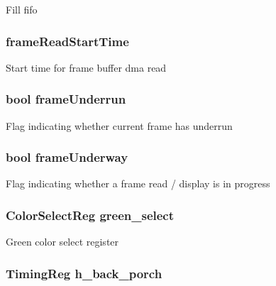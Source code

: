 \label{classHDLcd_a1735216e127216309b2b871f35b62fc7}
Fill fifo \hypertarget{classHDLcd_a9c95baa754410596ad866c39aba696f4}{
\subsubsection[{frameReadStartTime}]{ {\bf frameReadStartTime}}}
\label{classHDLcd_a9c95baa754410596ad866c39aba696f4}
Start time for frame buffer dma read \hypertarget{classHDLcd_a2c55466de4118724cb375f5d1c7844e8}{
\subsubsection[{frameUnderrun}]{\setlength{\rightskip}{0pt plus 5cm}bool {\bf frameUnderrun}}}
\label{classHDLcd_a2c55466de4118724cb375f5d1c7844e8}
Flag indicating whether current frame has underrun \hypertarget{classHDLcd_a36c69169afb7a9e1f41eb2b5fc7516c5}{
\subsubsection[{frameUnderway}]{\setlength{\rightskip}{0pt plus 5cm}bool {\bf frameUnderway}}}
\label{classHDLcd_a36c69169afb7a9e1f41eb2b5fc7516c5}
Flag indicating whether a frame read / display is in progress \hypertarget{classHDLcd_abe59898cf9345a10d5927b545e832923}{
\subsubsection[{green\_\-select}]{\setlength{\rightskip}{0pt plus 5cm}ColorSelectReg {\bf green\_\-select}}}
\label{classHDLcd_abe59898cf9345a10d5927b545e832923}
Green color select register \hypertarget{classHDLcd_a2bafb13ce63125c580ceb36a81af2817}{
\subsubsection[{h\_\-back\_\-porch}]{\setlength{\rightskip}{0pt plus 5cm}TimingReg {\bf h\_\-back\_\-porch}}}
